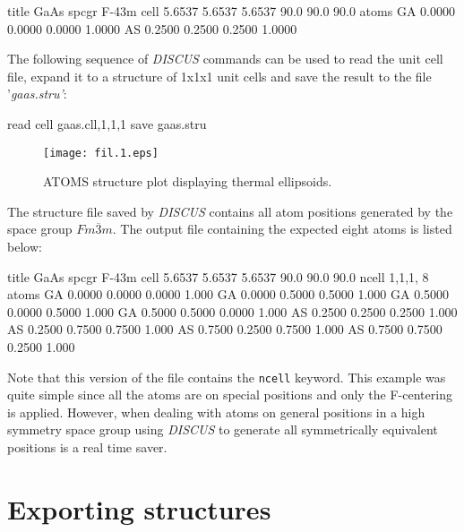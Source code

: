 \begin{MacVerbatim}
    title GaAs
    spcgr F-43m
    cell 5.6537  5.6537  5.6537  90.0  90.0  90.0
    atoms
    GA    0.0000  0.0000  0.0000  1.0000
    AS    0.2500  0.2500  0.2500  1.0000
\end{MacVerbatim}

The following sequence of {\it DISCUS} commands can be used to read
the unit cell file, expand it to a structure of 1x1x1 unit cells and
save the result to the file '{\it gaas.stru'}:

\begin{MacVerbatim}
    read
    cell gaas.cll,1,1,1
    save gaas.stru
\end{MacVerbatim}

\begin{figure}[!t]
   \centering
   \texttt{[image: fil.1.eps]}
   \caption[ATOMS structure plot example]
           {ATOMS structure plot displaying thermal ellipsoids.}
   \label{fil_fig1}
\end{figure}

The structure file saved by {\it DISCUS} contains all atom positions
generated by the space group $Fm\overline{3}m$. The output file
containing the expected eight atoms is listed below:

\begin{MacVerbatim}
    title GaAs
    spcgr F-43m
    cell    5.6537    5.6537    5.6537   90.0   90.0   90.0
    ncell   1,1,1, 8
    atoms
    GA     0.0000    0.0000    0.0000      1.000
    GA     0.0000    0.5000    0.5000      1.000
    GA     0.5000    0.0000    0.5000      1.000
    GA     0.5000    0.5000    0.0000      1.000
    AS     0.2500    0.2500    0.2500      1.000
    AS     0.2500    0.7500    0.7500      1.000
    AS     0.7500    0.2500    0.7500      1.000
    AS     0.7500    0.7500    0.2500      1.000
\end{MacVerbatim}

Note that this version of the file contains the {\tt ncell} keyword.
This example was quite simple since all the atoms are on special
positions and only the F-centering is applied. However, when dealing
with atoms on general positions in a high symmetry space group using
{\it DISCUS} to generate all symmetrically equivalent positions is a
real time saver.


\section{Exporting structures \label{file_export}}

